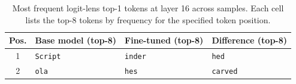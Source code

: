 \begin{table}[t]
\centering
\small
\begin{tabular}{c|p{4.2cm}|p{4.2cm}|p{4.2cm}}
\hline
\textbf{Pos.} & \textbf{Base model (top-8)} & \textbf{Fine-tuned (top-8)} & \textbf{Difference (top-8)} \\
\hline
1 & \texttt{Script} & \texttt{inder} & \texttt{hed} \\
\hline
2 & \texttt{ola} & \texttt{hes} & \texttt{carved} \\
\hline
\end{tabular}
\caption{Most frequent logit-lens top-1 tokens at layer 16 across samples. Each cell lists the top-8 tokens by frequency for the specified token position.}
\label{tab:logit_lens_top_tokens}
\end{table}